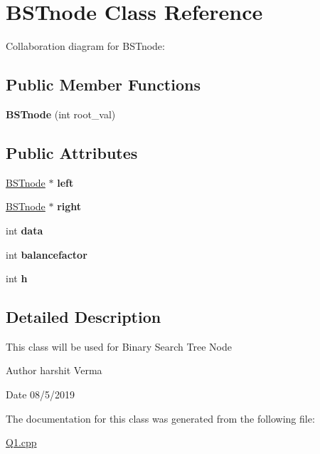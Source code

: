 \hypertarget{classBSTnode}{}\section{B\+S\+Tnode Class Reference}
\label{classBSTnode}


Collaboration diagram for B\+S\+Tnode\+:
\subsection*{Public Member Functions}
\begin{DoxyCompactItemize}
\item 
\mbox{\label{classBSTnode_a409dc25821cc67b76055375e75c810c6}} 
{\bfseries B\+S\+Tnode} (int root\+\_\+val)
\end{DoxyCompactItemize}
\subsection*{Public Attributes}
\begin{DoxyCompactItemize}
\item 
\mbox{\label{classBSTnode_a614440c999cb3bef1c99b3283978e654}} 
\hyperlink{classBSTnode}{B\+S\+Tnode} $\ast$ {\bfseries left}
\item 
\mbox{\label{classBSTnode_a6556c9a5b30b4b06aa7b5ea9f77d4300}} 
\hyperlink{classBSTnode}{B\+S\+Tnode} $\ast$ {\bfseries right}
\item 
\mbox{\label{classBSTnode_a7bd5564398058467908de78c7cf098c9}} 
int {\bfseries data}
\item 
\mbox{\label{classBSTnode_a221ed2c859b0cd1fd2e02fa1547973a7}} 
int {\bfseries balancefactor}
\item 
\mbox{\label{classBSTnode_a62d1e3dfbd544fc461f2836ef81f883b}} 
int {\bfseries h}
\end{DoxyCompactItemize}


\subsection{Detailed Description}
This class will be used for Binary Search Tree Node \begin{DoxyAuthor}{Author}
harshit Verma 
\end{DoxyAuthor}
\begin{DoxyDate}{Date}
08/5/2019 
\end{DoxyDate}


The documentation for this class was generated from the following file\+:\begin{DoxyCompactItemize}
\item 
\hyperlink{Q1_8cpp}{Q1.\+cpp}\end{DoxyCompactItemize}
